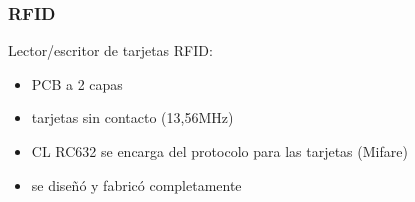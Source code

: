 \documentclass{beamer}
\begin{document}
\begin{frame}
	\frametitle{RFID}
	Lector/escritor de tarjetas RFID:
	\begin{figure}
	\end{figure}

	\begin{itemize}
		\item PCB a 2 capas

		\bigskip
		\item tarjetas sin contacto (13,56MHz)

		\bigskip
		\item CL RC632 se encarga del protocolo para las tarjetas (Mifare)

		\bigskip
		\item se diseñó y fabricó completamente
	\end{itemize}
\end{frame}
\end{document}
